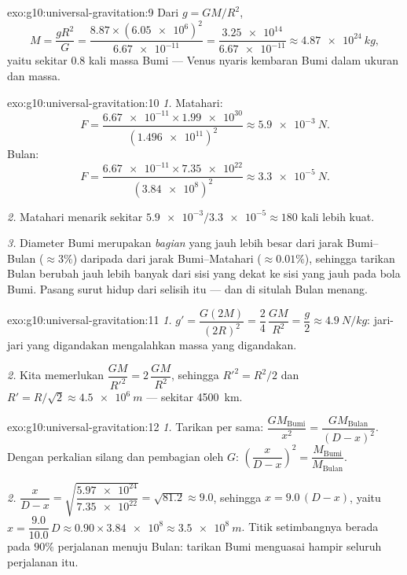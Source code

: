 \begin{solution}{exo:g10:universal-gravitation:9}
Dari $g = GM/R^2$,
\[
M = \frac{g R^2}{G}
= \frac{8.87 \times (\num{6.05e6})^2}{\num{6.67e-11}}
= \frac{\num{3.25e14}}{\num{6.67e-11}}
\approx \qty{4.87e24}{kg},
\]
yaitu sekitar $0.8$ kali massa Bumi --- Venus nyaris kembaran Bumi
dalam ukuran dan massa.
\end{solution}

\begin{solution}{exo:g10:universal-gravitation:10}
\emph{1.} Matahari:
\[ F = \dfrac{\num{6.67e-11} \times \num{1.99e30}}{(\num{1.496e11})^2}
\approx \qty{5.9e-3}{N}. \]
Bulan:
\[ F = \dfrac{\num{6.67e-11} \times \num{7.35e22}}{(\num{3.84e8})^2}
\approx \qty{3.3e-5}{N}. \]

\emph{2.} Matahari menarik sekitar
$\num{5.9e-3}/\num{3.3e-5} \approx 180$ kali lebih kuat.

\emph{3.} Diameter Bumi merupakan \emph{bagian} yang jauh lebih besar
dari jarak Bumi--Bulan ($\approx 3\%$) daripada dari jarak
Bumi--Matahari ($\approx 0.01\%$), sehingga tarikan Bulan berubah jauh
lebih banyak dari sisi yang dekat ke sisi yang jauh pada bola Bumi.
Pasang surut hidup dari selisih itu --- dan di situlah Bulan menang.
\end{solution}

\begin{solution}{exo:g10:universal-gravitation:11}
\emph{1.} $g' = \dfrac{G (2M)}{(2R)^2} = \dfrac{2}{4}\,\dfrac{GM}{R^2}
= \dfrac{g}{2} \approx \qty{4.9}{N/kg}$: jari-jari yang digandakan
mengalahkan massa yang digandakan.

\emph{2.} Kita memerlukan $\dfrac{GM}{R'^2} = 2\,\dfrac{GM}{R^2}$,
sehingga $R'^2 = R^2/2$ dan $R' = R/\sqrt{2} \approx \qty{4.5e6}{m}$
--- sekitar \qty{4500}{km}.
\end{solution}

\begin{solution}{exo:g10:universal-gravitation:12}
\emph{1.} Tarikan per  sama:
$\dfrac{G M_{\text{Bumi}}}{x^2} = \dfrac{G M_{\text{Bulan}}}{(D-x)^2}$.
Dengan perkalian silang dan pembagian oleh $G$:
$\left(\dfrac{x}{D-x}\right)^2 = \dfrac{M_{\text{Bumi}}}{M_{\text{Bulan}}}$.

\emph{2.} $\dfrac{x}{D-x}
= \sqrt{\dfrac{\num{5.97e24}}{\num{7.35e22}}} = \sqrt{81.2} \approx
9.0$, sehingga $x = 9.0\,(D - x)$, yaitu $x = \dfrac{9.0}{10.0}\,D
\approx 0.90 \times \num{3.84e8} \approx \qty{3.5e8}{m}$. Titik
setimbangnya berada pada $90\%$ perjalanan menuju Bulan: tarikan Bumi
menguasai hampir seluruh perjalanan itu.
\end{solution}


